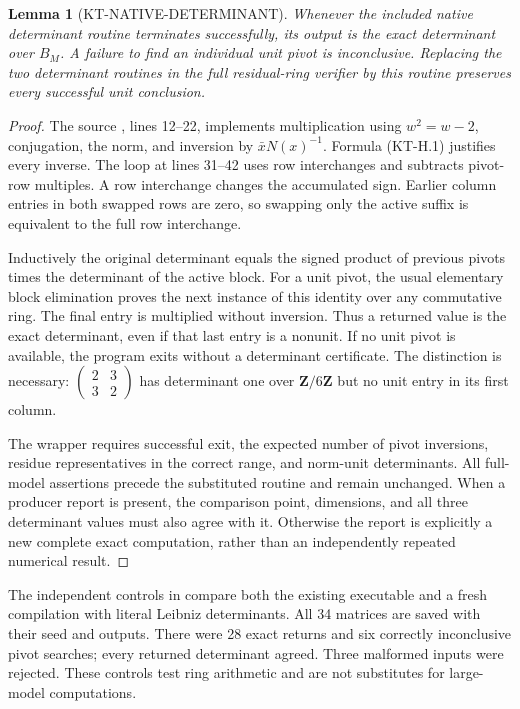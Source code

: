 \documentclass[11pt,a4paper]{article}
\newtheorem{lemma}[theorem]{Lemma}
\theoremstyle{definition}
\begin{document}
\begin{lemma}[KT-NATIVE-DETERMINANT]
Whenever the included native determinant routine terminates
successfully, its output is the exact determinant over $B_M$.
A failure to find an individual unit pivot is inconclusive.
Replacing the two determinant routines in the full residual-ring
verifier by this routine preserves every successful unit conclusion.
\end{lemma}
\begin{proof}
The source , lines 12--22,
implements multiplication using $w^2=w-2$, conjugation, the norm,
and inversion by $\bar xN(x)^{-1}$.  Formula (KT-H.1) justifies
every inverse.  The loop at lines 31--42 uses row interchanges and
subtracts pivot-row multiples.  A row interchange changes the
accumulated sign.  Earlier column entries in both swapped rows
are zero, so swapping only the active suffix is equivalent to
the full row interchange.

Inductively the original determinant equals the signed product
of previous pivots times the determinant of the active block.
For a unit pivot, the usual elementary block elimination proves
the next instance of this identity over any commutative ring.
The final entry is multiplied without inversion.  Thus a returned
value is the exact determinant, even if that last entry is a
nonunit.  If no unit pivot is available, the program exits without
a determinant certificate.  The distinction is necessary:
$\left(\begin{smallmatrix}2&3\\3&2\end{smallmatrix}\right)$
has determinant one over $\mathbf Z/6\mathbf Z$ but no unit
entry in its first column.

The wrapper requires successful exit, the expected number of
pivot inversions, residue representatives in the correct range,
and norm-unit determinants.  All full-model assertions precede
the substituted routine and remain unchanged.  When a producer
report is present, the comparison point, dimensions, and all
three determinant values must also agree with it.  Otherwise the
report is explicitly a new complete exact computation, rather
than an independently repeated numerical result.
\end{proof}

The independent controls in 
compare both the existing executable and a fresh compilation with
literal Leibniz determinants.  All 34 matrices are saved with
their seed and outputs.  There were 28 exact returns and six
correctly inconclusive pivot searches; every returned determinant
agreed.  Three malformed inputs were rejected.  These controls
test ring arithmetic and are not substitutes for large-model
computations.
\end{document}
